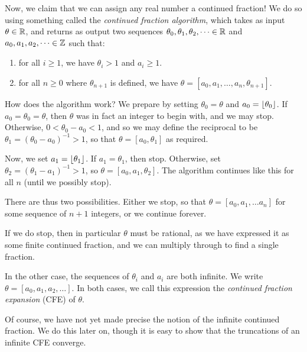 \documentclass{article}
\begin{document}
Now, we claim that we can assign any real number a continued fraction! We do so using something called the \textit{continued fraction algorithm}, which takes as input $\theta \in \mathbb{R}$, and returns as output two sequences $\theta_0, \theta_1, \theta_2, \dots \in \mathbb{R}$ and $a_0, a_1, a_2, \dots \in \mathbb{Z}$ such that:
\begin{enumerate}
    \item for all $i \geq 1$, we have $\theta_i > 1$ and $a_i \geq 1$.
    \item for all $n \geq 0$ where $\theta_{n+1}$ is defined, we have $\theta = [a_0, a_1, \dots, a_n, \theta_{n+1}]$.
\end{enumerate}
How does the algorithm work? We prepare by setting $\theta_0 = \theta$ and $a_0 = \left\lfloor\theta_0\right\rfloor$. If $a_0 = \theta_0 = \theta$, then $\theta$ was in fact an integer to begin with, and we may stop. Otherwise, $0 < \theta_0 - a_0 < 1$, and so we may define the reciprocal to be $\theta_1 = (\theta_0 - a_0)^{-1} > 1$, so that $\theta = [a_0, \theta_1]$ as required.

Now, we set $a_1 = \left\lfloor\theta_1\right\rfloor$. If $a_1 = \theta_1$, then stop. Otherwise, set $\theta_2 = (\theta_1 - a_1)^{-1} > 1$, so $\theta = [a_0, a_1, \theta_2]$.
The algorithm continues like this for all $n$ (until we possibly stop).

There are thus two possibilities. Either we stop, so that $\theta = [a_0, a_1, \dots a_n]$ for some sequence of $n+1$ integers, or we continue forever.

\begin{note}
	If we do stop, then in particular $\theta$ must be rational, as we have expressed it as some finite continued fraction, and we can multiply through to find a single fraction.
\end{note}

In the other case, the sequences of $\theta_i$ and $a_i$ are both infinite. We write $\theta = [a_0, a_1, a_2, \dots]$. In both cases, we call this expression the \textit{continued fraction expansion} (CFE) of $\theta$.

\begin{note}
	Of course, we have not yet made precise the notion of the infinite continued fraction. We do this later on, though it is easy to show that the truncations of an infinite CFE converge. 
\end{note}
\end{document}
